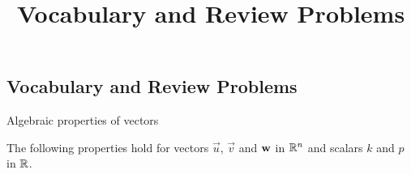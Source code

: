 \documentclass{ximera}
\title{Vocabulary and Review Problems} \license{CC BY-NC-SA 4.0}
\begin{document}
\begin{abstract}
\end{abstract}
\maketitle


\begin{onlineOnly}
\section*{Vocabulary and Review Problems}\label{section:VOCAB_prelim}
\end{onlineOnly}

Algebraic properties of vectors

The following properties hold for vectors $\vec{u}$, $\vec{v}$ and ${\bf w}$ in $\mathbb{R}^n$ and scalars $k$ and $p$ in $\mathbb{R}$.
\end{document}
